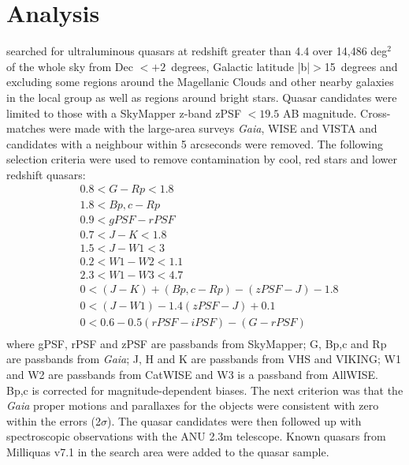 \documentclass[a4paper,fleqn,usenatbib]{mnras}
\begin{document}

\section{Analysis}
\label{Analysis}

\citet{onken22} searched  for ultraluminous quasars at redshift greater than 4.4 over 14,486 deg$^2$ of the {whole sky} from Dec $< +2$~degrees, Galactic latitude |b|$>$15~degrees and excluding some regions around the Magellanic Clouds and other nearby galaxies in the local group as well as regions around bright stars.  {Quasar candidates were limited to those with a  SkyMapper z-band zPSF $< 19.5$ AB magnitude.  Cross-matches were made with the large-area surveys {\it Gaia}, WISE and VISTA and candidates with a neighbour within 5 arcseconds were removed.  The following selection criteria were used to remove contamination by cool, red stars and lower redshift quasars: 
\begin{equation}
\begin{split}
& 0.8 < G - Rp < 1.8 \\
& 1.8 < Bp,c - Rp \\
& 0.9 < gPSF - rPSF \\
& 0.7 < J - K < 1.8 \\
& 1.5 < J - W1 < 3 \\
& 0.2 < W1 - W2 < 1.1 \\
& 2.3 < W1 - W3 < 4.7 \\
& 0 < (J - K) + (Bp,c - Rp ) - (zPSF - J ) - 1.8 \\
& 0 < (J - W1) - 1.4(zPSF - J ) + 0.1 \\
& 0 < 0.6 - 0.5(rPSF - iPSF ) - (G - rPSF ) \\
\end{split}
\end{equation}
where gPSF, rPSF and zPSF are passbands from SkyMapper; G, Bp,c and Rp are passbands from {\it Gaia}; J, H and K are passbands from VHS and VIKING; W1 and W2 are passbands from CatWISE and W3 is a passband from AllWISE.  Bp,c is corrected for magnitude-dependent biases.  The next criterion was that the {\it Gaia} proper motions and parallaxes for the objects were consistent with zero within the errors  (2$\sigma$).}  The quasar candidates were then followed up with spectroscopic observations with the ANU 2.3m telescope. Known quasars from Milliquas v7.1 \citep{flesch15} in the search area were added to the quasar sample.  
\end{document}
